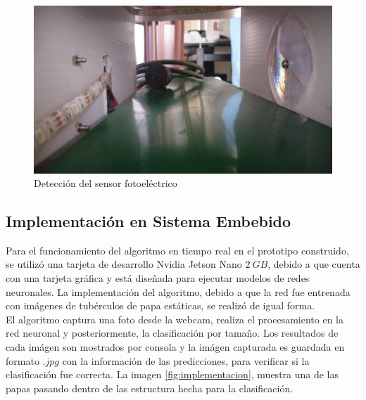 		\begin{figure}[ht]
			\centering
			\includegraphics[scale=0.23]{Figs/203.jpg}
			\caption{Detección del sensor fotoeléctrico}
			\label{fig:sensor}
		\end{figure}
	
	\newpage
	\subsection{Implementación en Sistema Embebido}
	
	Para el funcionamiento del algoritmo en tiempo real en el prototipo construido, se utilizó una tarjeta de desarrollo Nvidia Jetson Nano $2 \ GB$, debido a que cuenta con una tarjeta gráfica y está diseñada para ejecutar modelos de redes neuronales. La implementación del algoritmo, debido a que la red fue entrenada con imágenes de tubérculos de papa estáticas, se realizó de igual forma.\\
	
	El algoritmo captura una foto desde la webcam, realiza el procesamiento en la red neuronal y posteriormente, la clasificación por tamaño. Los resultados de cada imágen son mostrados por consola y la imágen capturada es guardada en formato $.jpg$ con la información de las predicciones, para verificar si la clasificación fue correcta. La imagen \ref{fig:implementacion}, muestra una de las papas pasando dentro de las estructura hecha para la clasificación.
	
